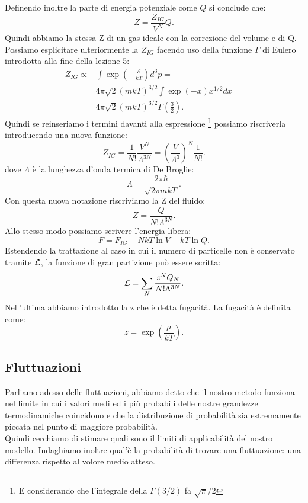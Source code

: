 Definendo inoltre la parte di energia potenziale come $Q$ si conclude che:
\[
	Z = \frac{Z_{IG}}{V^{N}}Q
.\] 
Quindi abbiamo la stessa Z di un gas ideale con la correzione del volume e di Q. \\
Possiamo esplicitare ulteriormente la $Z_{IG}$ facendo uso della funzione $\Gamma$ di Eulero introdotta alla fine della lezione 5:
\begin{align}
	Z_{IG} \propto& \int \exp\left( -\frac{\mathcal{E}}{kT} \right) d^3p = \\
	=& 4\pi\sqrt{2} \left( mkT \right) ^{3 /2} \int \exp\left( -x \right) x^{1 /2}dx=\\
	=&4\pi\sqrt{2} \left( mkT \right) ^{3 /2} \Gamma\left( \frac{3}{2} \right) 
.\end{align}
Quindi se reinseriamo i termini davanti alla espressione \footnote{E considerando che l'integrale della $\Gamma\left( 3 / 2 \right)$ fa $\sqrt{\pi}/2$} possiamo riscriverla introducendo una nuova funzione:
 \[
	 Z_{IG} = \frac{1}{N!} \frac{V^{N}}{\Lambda^{3N}} = \left( \frac{V}{\Lambda^3} \right)^{N} \frac{1}{N!} 
.\] 
dove $\Lambda$ è la lunghezza d'onda termica di De Broglie: 
\[
	\Lambda = \frac{2\pi \hbar }{\sqrt{2\pi m kT} }
.\] 
Con questa nuova notazione riscriviamo la Z del fluido:
\[
	Z = \frac{Q}{N! \Lambda^{3N}}
.\] 
Allo stesso modo possiamo scrivere l'energia libera:
\[
	F = F_{IG}- NkT \ln V - kT \ln Q
.\] 
Estendendo la trattazione al caso in cui il numero di particelle non è conservato tramite $\mathcal{L}$, la funzione di gran partizione può essere scritta:
\[
	\mathcal{L} = \sum_{N}^{} \frac{z^{N} Q_{N}}{N! \Lambda^{3N}}
.\] 
Nell'ultima abbiamo introdotto la z che è detta fugacità. La fugacità è definita come: 
\[
	z = \exp\left( \frac{\mu}{kT} \right) 
.\] 
\subsection{Fluttuazioni}%
Parliamo adesso delle fluttuazioni, abbiamo detto che il nostro metodo funziona nel limite in cui i valori medi ed i più probabili delle nostre grandezze termodinamiche coincidono e che la distribuzione di probabilità sia estremamente piccata nel punto di maggiore probabilità.\\
Quindi cerchiamo di stimare quali sono il limiti di applicabilità del nostro modello. Indaghiamo inoltre qual'è la probabilità di trovare una fluttuazione: una differenza rispetto al volore medio atteso.\\
